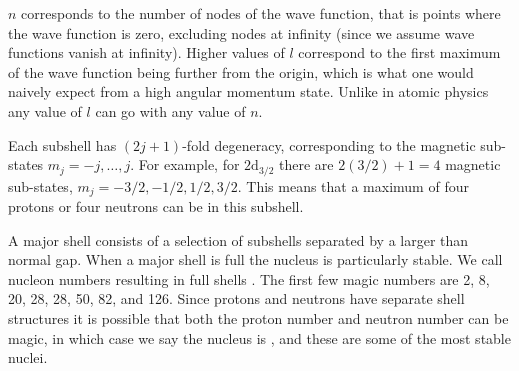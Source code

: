 \documentclass[fleqn]{NotesClass}
\begin{document}
    \(n\) corresponds to the number of nodes of the wave function, that is points where the wave function is zero, excluding nodes at infinity (since we assume wave functions vanish at infinity).
    Higher values of \(l\) correspond to the first maximum of the wave function being further from the origin, which is what one would naively expect from a high angular momentum state.
    Unlike in atomic physics any value of \(l\) can go with any value of \(n\).
    
    Each subshell has \((2j + 1)\)-fold degeneracy, corresponding to the magnetic sub-states \(m_{j} = -j, \dotsc, j\).
    For example, for \(2\mathrm{d}_{3/2}\) there are \(2(3/2) + 1 = 4\) magnetic sub-states, \(m_j = -3/2, -1/2, 1/2, 3/2\).
    This means that a maximum of four protons or four neutrons can be in this subshell.
    
    A major shell consists of a selection of subshells separated by a larger than normal gap.
    When a major shell is full the nucleus is particularly stable.
    We call nucleon numbers resulting in full shells .
    The first few magic numbers are 2, 8, 20, 28, 28, 50, 82, and 126.
    Since protons and neutrons have separate shell structures it is possible that both the proton number and neutron number can be magic, in which case we say the nucleus is , and these are some of the most stable nuclei.
    
\end{document}
